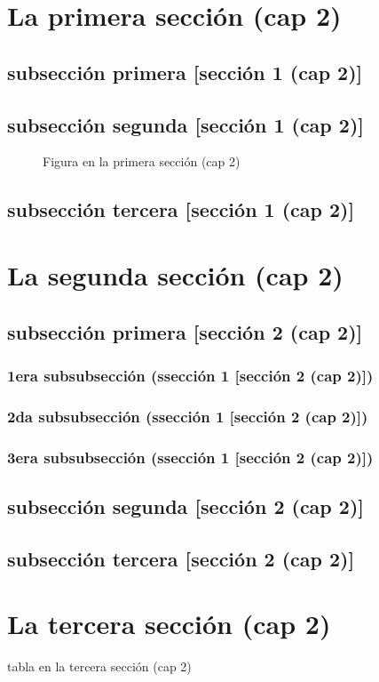 \documentclass[12pt,a4paper]{report}
\begin{document}
\section{La primera sección (cap 2)}
\subsection{subsección primera [sección 1 (cap 2)]}
\subsection{subsección segunda [sección 1 (cap 2)]}
\begin{figure}[H]
\caption{Figura en la primera sección (cap 2)}
\end{figure}
\subsection{subsección tercera [sección 1 (cap 2)]}
\section{La segunda sección (cap 2)}
\subsection{subsección primera [sección 2 (cap 2)]}
\subsubsection{1era subsubsección (ssección 1 [sección 2 (cap 2)])}
\subsubsection{2da subsubsección (ssección 1 [sección 2 (cap 2)])}
\subsubsection{3era subsubsección (ssección 1 [sección 2 (cap 2)])}
\subsection{subsección segunda [sección 2 (cap 2)]}
\subsection{subsección tercera [sección 2 (cap 2)]}
\section{La tercera sección (cap 2)}
\begin{table}[H]
\caption{tabla en la tercera sección (cap 2)}
\end{table}
\end{document}
